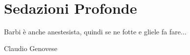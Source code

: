 \chapter{Sedazioni Profonde}

\epigraph{Barbi è anche anestesista, quindi se ne fotte e gliele fa fare...}{Claudio Genovese}

\lipsum